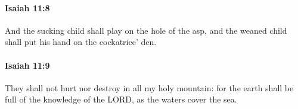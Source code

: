 		\paragraph{Isaiah 11:8} %
			\label{ISAIAH-11-8}

			And the sucking child shall play on the hole of the asp, and the weaned child shall put his hand on the cockatrice' den.


		\paragraph{Isaiah 11:9} %
			\label{ISAIAH-11-9}

			They shall not hurt nor destroy in all my holy mountain: for the earth shall be full of the knowledge of the LORD, as the waters cover the sea.


